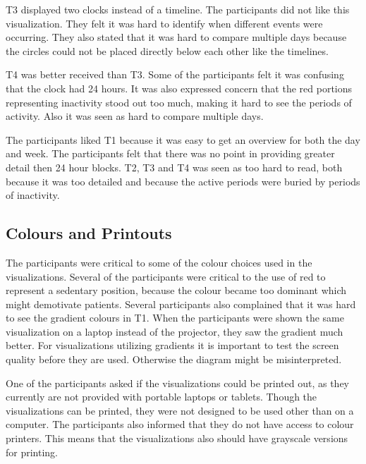 T3 displayed two clocks instead of a timeline. The participants did not like this visualization. They felt it was hard to identify when different events were occurring. They also stated that it was hard to compare multiple days because the circles could not be placed directly below each other like the timelines.

T4 was better received than T3. Some of the participants felt it was confusing that the clock had 24 hours. It was also expressed concern that the red portions representing inactivity stood out too much, making it hard to see the periods of activity. Also it was seen as hard to compare multiple days.

The participants liked T1 because it was easy to get an overview for both the day and week. The participants felt that there was no point in providing greater detail then 24 hour blocks. T2, T3 and T4 was seen as too hard to read, both because it was too detailed and because the active periods were buried by periods of inactivity.

\subsection{Colours and Printouts}
The participants were critical to some of the colour choices used in the visualizations. Several of the participants were critical to the use of red to represent a sedentary position, because the colour became too dominant which might demotivate patients. Several participants also complained that it was hard to see the gradient colours in T1. When the participants were shown the same visualization on a laptop instead of the projector, they saw the gradient much better. For visualizations utilizing gradients it is important to test the screen quality before they are used. Otherwise the diagram might be misinterpreted. 

One of the participants asked if the visualizations could be printed out, as they currently are not provided with portable laptops or tablets. Though the visualizations can be printed, they were not designed to be used other than on a computer. The participants also informed that they do not have access to colour printers. This means that the visualizations also should have grayscale versions for printing. 
